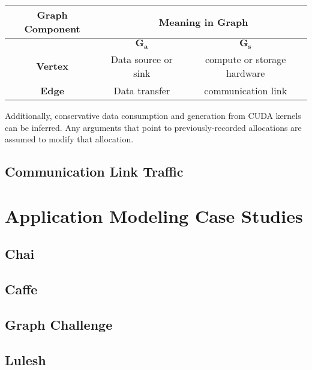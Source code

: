 \begin{table}[h]
    \centering
    \caption{}
    \label{tab:graph-comparison}
    \begin{tabular}{|c|c|c|}
    \hline
    \textbf{Graph Component} & \multicolumn{2}{|c|}{\textbf{Meaning in Graph}}   \\ \hline
                             & $\bm{G_a}$    & $\bm{G_s}$                        \\ \hline \hline
    \textbf{Vertex}          & Data source or sink & compute or storage hardware \\ \hline
    \textbf{Edge}            & Data transfer & communication link                \\ \hline
    \end{tabular}
\end{table}

Additionally, conservative data consumption and generation from CUDA kernels can be inferred.
Any arguments that point to previously-recorded allocations are assumed to modify that allocation.



\subsection{Communication Link Traffic}



\section{Application Modeling Case Studies}
\subsection{Chai}
\subsection{Caffe}
\subsection{Graph Challenge}
\subsection{Lulesh}